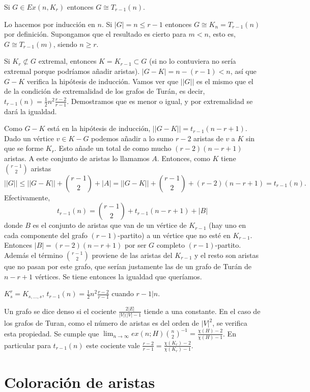 \documentclass[TGyGC.tex]{subfiles}
\begin{document}
\begin{teorema}
Si $G\in Ex(n,K_r)$ entonces $G\cong T_{r-1}(n)$.
\end{teorema}
\begin{dem}
Lo hacemos por inducción en $n$. Si $|G|=n\leq r-1$ entonces $G\cong K_n=T_{r-1}(n)$ por definición. Supongamos que el resultado es cierto para $m<n$, esto es, $G\cong T_{r-1}(m)$, siendo $n\geq r$. 

Si $K_r\not\subset G$ extremal, entonces $K=K_{r-1}\subset G$ (si no lo contuviera no sería extremal porque podríamos añadir aristas). $|G-K|=n-(r-1)<n$, así que $G-K$ verifica la hipótesis de inducción. Vamos ver que $||G||$ es el mismo que el de la condición de extremalidad de los grafos de Turán, es decir, $t_{r-1}(n)=\frac{1}{2}n^2\frac{r-2}{r-1}$. Demostramos que es menor o igual, y por extremalidad se dará la igualdad.

Como $G-K$ está en la hipótesis de inducción, $||G-K||=t_{r-1}(n-r+1)$. Dado un vértice $v\in K-G$ podemos añadir a lo sumo $r-2$ aristas de $v$ a $K$ sin que se forme $K_r$. Esto añade un total de como mucho $(r-2)(n-r+1)$ aristas. A este conjunto de aristas lo llamamos $A$. Entonces, como $K$ tiene $\binom{r-1}{2}$ aristas
\[
||G||\leq ||G-K||+\binom{r-1}{2}+|A|=||G-K||+\binom{r-1}{2}+(r-2)(n-r+1)=t_{r-1}(n).
\] 
Efectivamente, 
\[
t_{r-1}(n)=\binom{r-1}{2}+t_{r-1}(n-r+1)+|B|
\]
donde $B$ es el conjunto de aristas que van de un vértice de $K_{r-1}$ (hay uno en cada componente del grafo $(r-1)$-partito) a un vértice que no esté en $K_{r-1}$. Entonces $|B|=(r-2)(n-r+1)$ por ser $G$ completo $(r-1)$-partito. Además el término $\binom{r-1}{2}$ proviene de las aristas del $K_{r-1}$ y el resto son aristas que no pasan por este grafo, que serían justamente las de un grafo de Turán de $n-r+1$ vértices. Se tiene entonces la igualdad que queríamos.
\end{dem}

$K_s^r=K_{s,\dots, s}$, $t_{r-1}(n)=\frac{1}{2}n^2\frac{r-2}{r-1}$ cuando $r-1|n$.

Un grafo se dice denso si el cociente $\frac{2|E|}{|V|(|V|-1}$ tiende a una constante. En el caso de los grafos de Turan, como el número de aristas es del orden de $|V|^2$, se verifica esta propiedad. Se cumple que $\lim_{n\to\infty} ex(n;H)\binom{n}{2}^{-1}=\frac{\chi(H)-2}{\chi(H)-1}$. En particular para $t_{r-1}(n)$ este cociente vale $\frac{r-2}{r-1}=\frac{\chi(K_r)-2}{\chi(K_r)-1}$. 

\section{Coloración de aristas}
\end{document}
